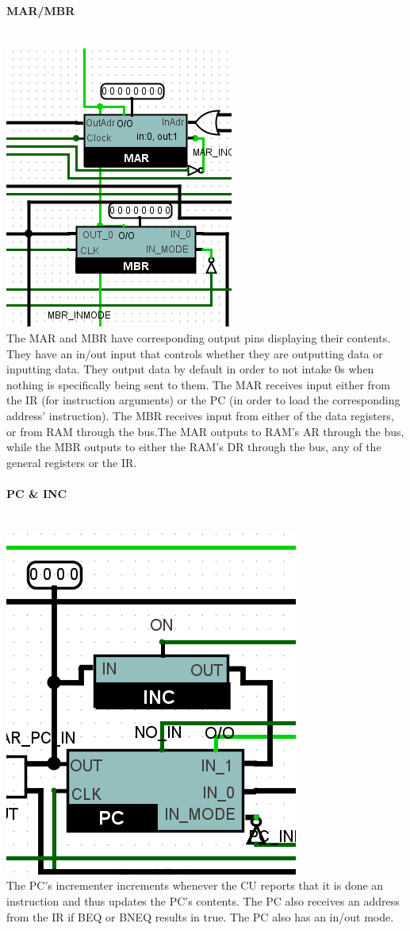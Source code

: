 \documentclass{article}
\begin{document}
	\paragraph{MAR/MBR}~
	\\ \includegraphics[scale=0.7]{MARMBR} \\The MAR and MBR have corresponding output pins displaying their contents. They have an in/out input that controls whether they are outputting data or inputting data. They output data by default in order to not intake 0s when nothing is specifically being sent to them. The MAR receives input either from the IR (for instruction arguments) or the PC (in order to load the corresponding address' instruction). The MBR receives input from either of the data registers, or from RAM through the bus.The MAR outputs to RAM's AR through the bus, while the MBR outputs to either the RAM's DR through the bus, any of the general registers or the IR.
	\paragraph{PC \& INC}~
	\\ \includegraphics[scale=0.5]{PC} \\ The PC's incrementer increments whenever the CU reports that it is done an instruction and thus updates the PC's contents. The PC also receives an address from the IR if BEQ or BNEQ results in true. The PC also has an in/out mode.
\end{document}
